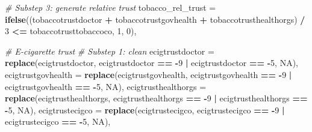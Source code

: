 \documentclass[
]{article}
\newenvironment{Shaded}{\begin{snugshade}}{\end{snugshade}}
\newcommand{\AttributeTok}[1]{\textcolor[rgb]{0.13,0.29,0.53}{#1}}
\newcommand{\CommentTok}[1]{\textcolor[rgb]{0.56,0.35,0.01}{\textit{#1}}}
\newcommand{\ConstantTok}[1]{\textcolor[rgb]{0.56,0.35,0.01}{#1}}
\newcommand{\DecValTok}[1]{\textcolor[rgb]{0.00,0.00,0.81}{#1}}
\newcommand{\FunctionTok}[1]{\textcolor[rgb]{0.13,0.29,0.53}{\textbf{#1}}}
\newcommand{\NormalTok}[1]{#1}
\newcommand{\SpecialCharTok}[1]{\textcolor[rgb]{0.81,0.36,0.00}{\textbf{#1}}}
\begin{document}
\begin{Shaded}
\begin{Highlighting}[]
    \CommentTok{\# Substep 3: generate \textquotesingle{}relative trust\textquotesingle{}}
    \AttributeTok{tobacco\_rel\_trust =} \FunctionTok{ifelse}\NormalTok{((tobaccotrustdoctor }\SpecialCharTok{+}\NormalTok{ tobaccotrustgovhealth }\SpecialCharTok{+}\NormalTok{ tobaccotrusthealthorgs) }\SpecialCharTok{/} \DecValTok{3} \SpecialCharTok{\textless{}=}\NormalTok{ tobaccotrusttobaccoco, }\DecValTok{1}\NormalTok{, }\DecValTok{0}\NormalTok{),}
    
    \CommentTok{\# E{-}cigarette trust}
    \CommentTok{\# Substep 1: clean}
    \AttributeTok{ecigtrustdoctor =} \FunctionTok{replace}\NormalTok{(ecigtrustdoctor,}
\NormalTok{                              ecigtrustdoctor }\SpecialCharTok{==} \SpecialCharTok{{-}}\DecValTok{9} \SpecialCharTok{|}\NormalTok{ ecigtrustdoctor }\SpecialCharTok{==} \SpecialCharTok{{-}}\DecValTok{5}\NormalTok{,}
                              \ConstantTok{NA}\NormalTok{),}
    \AttributeTok{ecigtrustgovhealth =} \FunctionTok{replace}\NormalTok{(ecigtrustgovhealth,}
\NormalTok{                                 ecigtrustgovhealth }\SpecialCharTok{==} \SpecialCharTok{{-}}\DecValTok{9} \SpecialCharTok{|}\NormalTok{ ecigtrustgovhealth }\SpecialCharTok{==} \SpecialCharTok{{-}}\DecValTok{5}\NormalTok{,}
                                 \ConstantTok{NA}\NormalTok{),}
    \AttributeTok{ecigtrusthealthorgs =} \FunctionTok{replace}\NormalTok{(ecigtrusthealthorgs,}
\NormalTok{                                  ecigtrusthealthorgs }\SpecialCharTok{==} \SpecialCharTok{{-}}\DecValTok{9} \SpecialCharTok{|}\NormalTok{ ecigtrusthealthorgs }\SpecialCharTok{==} \SpecialCharTok{{-}}\DecValTok{5}\NormalTok{,}
                                  \ConstantTok{NA}\NormalTok{),}
    \AttributeTok{ecigtrustecigco =} \FunctionTok{replace}\NormalTok{(ecigtrustecigco,}
\NormalTok{                              ecigtrustecigco }\SpecialCharTok{==} \SpecialCharTok{{-}}\DecValTok{9} \SpecialCharTok{|}\NormalTok{ ecigtrustecigco }\SpecialCharTok{==} \SpecialCharTok{{-}}\DecValTok{5}\NormalTok{,}
                              \ConstantTok{NA}\NormalTok{),}
    

\end{Highlighting}
\end{Shaded}
\end{document}

